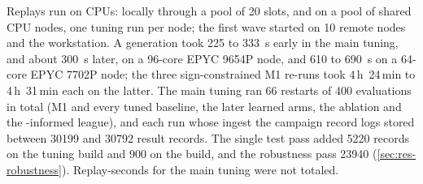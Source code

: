 Replays run on CPUs: locally through a pool of 20 slots, and on a pool of shared CPU nodes, one
tuning run per node; the first wave started on 10 remote nodes and the workstation. A generation
took 225 to \SI{333}{s} early in the main tuning, and about \SI{300}{s} later, on a 96-core EPYC
9654P node, and 610 to \SI{690}{s} on a 64-core EPYC 7702P node; the three sign-constrained M1
re-runs took 4\,h~24\,min to 4\,h~31\,min each on the latter. The main tuning ran 66 restarts of
400 evaluations in total (M1 and every tuned baseline, the later learned arms, the ablation and
the \ais{}-informed league), and each run whose ingest the campaign record logs stored between \num{30199}
and \num{30792} result records. The single test pass added \num{5220} records on the tuning build
and 900 on the \ais{} build, and the robustness pass \num{23940} (\cref{sec:res-robustness}).
Replay-seconds for the main tuning were not totaled.

